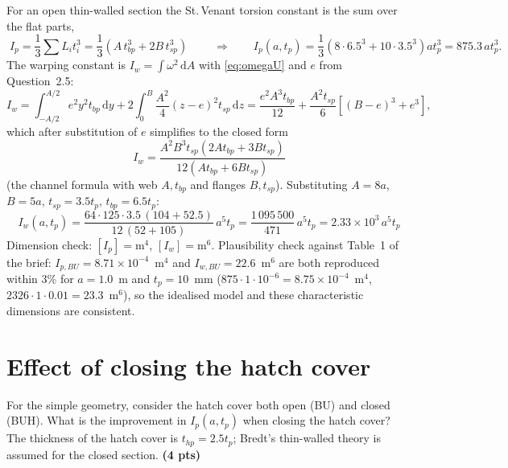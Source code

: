 \bigskip
For an open thin-walled section the St.\,Venant torsion constant is the sum over the flat parts,
\begin{equation}
  \boxed{\;I_p=\frac{1}{3}\sum L_it_i^3=\frac{1}{3}\left(A\,t_{bp}^3+2B\,t_{sp}^3\right)\;}
  \qquad\Rightarrow\qquad I_p(a,t_p)=\frac{1}{3}\left(8\cdot6.5^3+10\cdot3.5^3\right)at_p^3=875.3\,at_p^3 .
\end{equation}
The warping constant is $I_w=\int\omega^2\,\mathrm{d}A$ with \eqref{eq:omegaU} and $e$ from Question~2.5:
\begin{equation}
  I_w=\int_{-A/2}^{A/2}e^2y^2t_{bp}\,\mathrm{d}y+2\int_0^B\frac{A^2}{4}(z-e)^2t_{sp}\,\mathrm{d}z
  =\frac{e^2A^3t_{bp}}{12}+\frac{A^2t_{sp}}{6}\left[(B-e)^3+e^3\right],
\end{equation}
which after substitution of $e$ simplifies to the closed form
\begin{equation}
  \boxed{\;I_w=\frac{A^2B^3t_{sp}\left(2At_{bp}+3Bt_{sp}\right)}{12\left(At_{bp}+6Bt_{sp}\right)}\;}
\end{equation}
(the channel formula with web $A,t_{bp}$ and flanges $B,t_{sp}$). Substituting $A=8a$, $B=5a$, $t_{sp}=3.5t_p$, $t_{bp}=6.5t_p$:
\begin{equation}
  \boxed{\;I_w(a,t_p)=\frac{64\cdot125\cdot3.5\,(104+52.5)}{12\,(52+105)}\,a^5t_p=\frac{1\,095\,500}{471}\,a^5t_p=2.33\times10^{3}\,a^5t_p\;}
\end{equation}
Dimension check: $[I_p]=\mathrm{m}^4$, $[I_w]=\mathrm{m}^6$. Plausibility check against Table~1 of the brief: $I_{p,BU}=8.71\times10^{-4}$~m$^4$ and $I_{w,BU}=22.6$~m$^6$ are both reproduced within 3\% for $a=1.0$~m and $t_p=10$~mm ($875\cdot1\cdot10^{-6}=8.75\times10^{-4}$~m$^4$, $2326\cdot1\cdot0.01=23.3$~m$^6$), so the idealised model and these characteristic dimensions are consistent.

\section{Effect of closing the hatch cover}

For the simple geometry, consider the hatch cover both open (BU) and closed (BUH). What is the improvement in $I_p(a,t_p)$ when closing the hatch cover? The thickness of the hatch cover is $t_{hp}=2.5t_p$; Bredt's thin-walled theory is assumed for the closed section. \textbf{(4 pts)}

